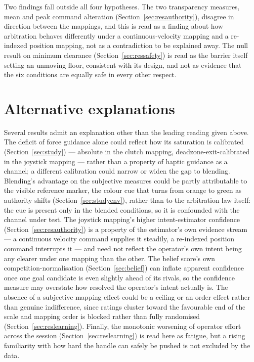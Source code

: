 Two findings fall outside all four hypotheses. The two transparency measures, mean and peak command alteration (Section~\ref{sec:resauthority}), disagree in direction between the mappings, and this is read as a finding about how arbitration behaves differently under a continuous-velocity mapping and a re-indexed position mapping, not as a contradiction to be explained away. The null result on minimum clearance (Section~\ref{sec:ressafety}) is read as the barrier itself setting an unmoving floor, consistent with its design, and not as evidence that the six conditions are equally safe in every other respect.

\section{Alternative explanations}
\label{sec:discussion-alternatives}

Several results admit an explanation other than the leading reading given above. The deficit of force guidance alone could reflect how its saturation is calibrated (Section~\ref{sec:study}) --- absolute in the clutch mapping, deadzone-exit-calibrated in the joystick mapping --- rather than a property of haptic guidance as a channel; a different calibration could narrow or widen the gap to blending. Blending's advantage on the subjective measures could be partly attributable to the visible reference marker, the colour cue that turns from orange to green as authority shifts (Section~\ref{sec:studyenv}), rather than to the arbitration law itself: the cue is present only in the blended conditions, so it is confounded with the channel under test. The joystick mapping's higher intent-estimator confidence (Section~\ref{sec:resauthority}) is a property of the estimator's own evidence stream --- a continuous velocity command supplies it steadily, a re-indexed position command interrupts it --- and need not reflect the operator's own intent being any clearer under one mapping than the other. The belief score's own competition-normalisation (Section~\ref{sec:belief}) can inflate apparent confidence once one goal candidate is even slightly ahead of its rivals, so the confidence measure may overstate how resolved the operator's intent actually is. The absence of a subjective mapping effect could be a ceiling or an order effect rather than genuine indifference, since ratings cluster toward the favourable end of the scale and mapping order is blocked rather than fully randomised (Section~\ref{sec:reslearning}). Finally, the monotonic worsening of operator effort across the session (Section~\ref{sec:reslearning}) is read here as fatigue, but a rising familiarity with how hard the handle can safely be pushed is not excluded by the data.


